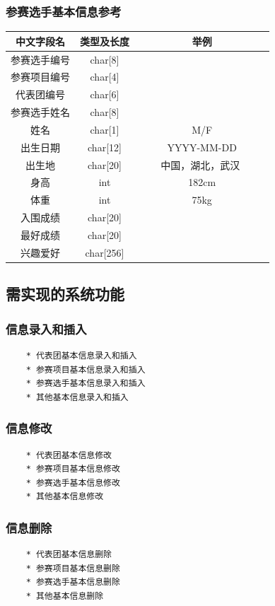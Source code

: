 \documentclass[10pt,a4paper]{article}
\begin{document}
\subsubsection{参赛选手基本信息参考}

\begin{tabular}{|c|c|c|}
  \hline
  中文字段名 & 类型及长度& 举例\\
  \hline
  参赛选手编号 & char[8] & \\
  \hline
  参赛项目编号 & char[4] & \\
  \hline
  代表团编号 & char[6] & \\
  \hline
  参赛选手姓名 & char[8] & \\
  \hline
  姓名 & char[1] & M/F \\
  \hline
  出生日期 & char[12] & YYYY-MM-DD \\
  \hline
  出生地 & char[20] & ~ ~ ~中国，湖北，武汉 ~ ~ ~ \\
  \hline
  身高 & int & 182cm\\
  \hline
  体重 & int & 75kg \\
  \hline
  入围成绩 & char[20] & \\
  \hline
    最好成绩 & char[20] & \\ 
  \hline
  兴趣爱好 & char[256] & \\
  \hline
\end{tabular}
\subsection{需实现的系统功能}
\subsubsection{信息录入和插入}
\begin{verbatim}
    * 代表团基本信息录入和插入
    * 参赛项目基本信息录入和插入 
    * 参赛选手基本信息录入和插入 
    * 其他基本信息录入和插入 
\end{verbatim}
\subsubsection{信息修改}
\begin{verbatim}
    * 代表团基本信息修改 
    * 参赛项目基本信息修改 
    * 参赛选手基本信息修改 
    * 其他基本信息修改 
\end{verbatim}
\subsubsection{信息删除}
\begin{verbatim}
    * 代表团基本信息删除 
    * 参赛项目基本信息删除
    * 参赛选手基本信息删除
    * 其他基本信息删除
\end{verbatim}
\end{document}
